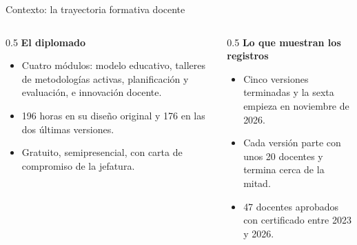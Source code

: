 \documentclass[10pt,aspectratio=169]{beamer}
\begin{document}
\begin{frame}{Contexto: la trayectoria formativa docente}
  \begin{center}
  \end{center}
  \vspace{0.3em}
  \begin{columns}[T]
    \begin{column}{0.5\textwidth}
      \textbf{El diplomado}
      \begin{itemize}\small
        \item Cuatro módulos: modelo educativo, talleres de metodologías activas, planificación y evaluación, e innovación docente.
        \item 196 horas en su diseño original y 176 en las dos últimas versiones.
        \item Gratuito, semipresencial, con carta de compromiso de la jefatura.
      \end{itemize}
    \end{column}
    \begin{column}{0.5\textwidth}
      \textbf{Lo que muestran los registros}
      \begin{itemize}\small
        \item Cinco versiones terminadas y la sexta empieza en noviembre de 2026.
        \item Cada versión parte con unos 20 docentes y termina cerca de la mitad.
        \item \alert{47 docentes aprobados} con certificado entre 2023 y 2026.
      \end{itemize}
    \end{column}
  \end{columns}
\end{frame}
\end{document}
